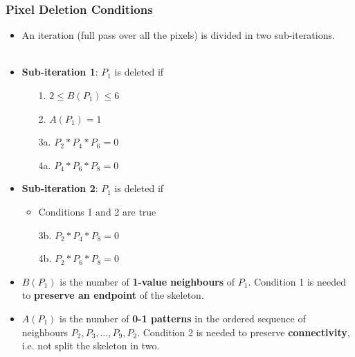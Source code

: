 \begin{frame}
  \frametitle{Pixel Deletion Conditions}
  \begin{itemize}
    \item An iteration (full pass over all the pixels) is divided in two sub-iterations.
          \\~\\
    \item \textbf{Sub-iteration 1}: $P_1$ is deleted if
          \begin{itemize}
            \item [1.] $2 \leq B(P_1) \leq 6$
            \item [2.]$A(P_1) = 1$
            \item [3a.]$P_2 * P_4 * P_6 = 0$
            \item [4a.]$P_4 * P_6 * P_8 = 0$
          \end{itemize}
          \vspace{0.3cm}
    \item \textbf{Sub-iteration 2}: $P_1$ is deleted if
          \begin{itemize}
            \item Conditions 1 and 2 are true
            \item [3b.] $P_2 * P_4 * P_8 = 0$
            \item [4b.]$P_2 * P_6 * P_8 = 0$
          \end{itemize}
          \vspace{0.3cm}
    \item $B(P_1)$ is the number of \textbf{1-value neighbours} of $P_1$. Condition 1 is needed to \textbf{preserve an endpoint} of the skeleton.
    \item $A(P_1)$ is the number of \textbf{0-1 patterns} in the ordered sequence of neighbours $P_2, P_3, \dots, P_9, P_2$. Condition 2 is needed to preserve \textbf{connectivity}, i.e. not split the skeleton in two.
  \end{itemize}
\end{frame}

